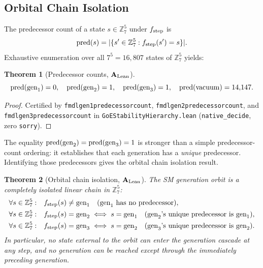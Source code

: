 \documentclass[11pt]{article}
\newtheorem{theorem}{Theorem}[section]
\theoremstyle{remark}
\newcommand{\lean}[1]{%
  \penalty-100
  \begingroup\def\_{\textunderscore\allowbreak}\texttt{#1}\endgroup}
\newcommand{\CatAL}{\ensuremath{\textbf{A}_{\rm Lean}}}
\begin{document}
\subsection{Orbital Chain Isolation}
\label{sec:chain_isolation}

The predecessor count of a state $s \in \mathbb{Z}_7^5$ under $f_{\rm step}$ is
\[
\mathrm{pred}(s) = |\{s' \in \mathbb{Z}_7^5 : f_{\rm step}(s') = s\}|.
\]
Exhaustive enumeration over all $7^5 = 16{,}807$ states of $\mathbb{Z}_7^5$ yields:

\begin{theorem}[Predecessor counts, $\CatAL$]\label{thm:pred_counts}
\[
\mathrm{pred}({\rm gen}_1) = 0,\quad
\mathrm{pred}({\rm gen}_2) = 1,\quad
\mathrm{pred}({\rm gen}_3) = 1,\quad
\mathrm{pred}({\rm vacuum}) = 14{,}147.
\]
\end{theorem}

\begin{proof}
Certified by \lean{fmdl\_gen1\_\allowbreak{}predecessor\_\allowbreak{}count},
\lean{fmdl\_gen2\_\allowbreak{}predecessor\_\allowbreak{}count},
and \lean{fmdl\_gen3\_\allowbreak{}predecessor\_\allowbreak{}count}
in \lean{GoE\allowbreak{}Stability\allowbreak{}Hierarchy.lean}
(\texttt{native\_decide}, zero \texttt{sorry}).
\end{proof}

The equality $\mathrm{pred}({\rm gen}_2) = \mathrm{pred}({\rm gen}_3) = 1$ is stronger
than a simple predecessor-count ordering: it establishes that each generation has a
\emph{unique} predecessor.
Identifying those predecessors gives the orbital chain isolation result.

\begin{theorem}[Orbital chain isolation, $\CatAL$]\label{thm:chain_isolation}
The SM generation orbit is a completely isolated linear chain in $\mathbb{Z}_7^5$:
\begin{align*}
\forall s \in \mathbb{Z}_7^5:\quad & f_{\rm step}(s) \neq {\rm gen}_1 \quad
  \text{(gen}_1 \text{ has no predecessor)},\\
\forall s \in \mathbb{Z}_7^5:\quad & f_{\rm step}(s) = {\rm gen}_2 \iff s = {\rm gen}_1 \quad
  \text{(gen}_2\text{'s unique predecessor is gen}_1\text{)},\\
\forall s \in \mathbb{Z}_7^5:\quad & f_{\rm step}(s) = {\rm gen}_3 \iff s = {\rm gen}_2 \quad
  \text{(gen}_3\text{'s unique predecessor is gen}_2\text{)}.
\end{align*}
In particular, no state external to the orbit can enter the generation cascade at any step,
and no generation can be reached except through the immediately preceding generation.
\end{theorem}
\end{document}
